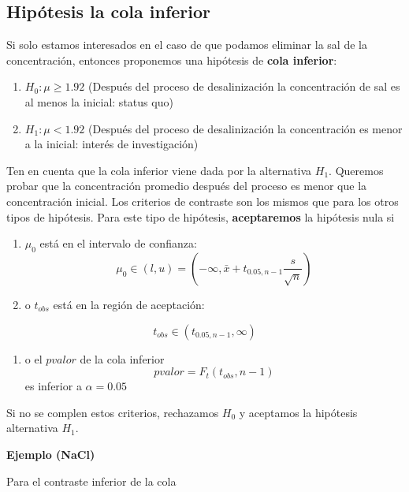 \documentclass[
]{book}
\providecommand{\tightlist}{%
  \setlength{\itemsep}{0pt}\setlength{\parskip}{0pt}}
\begin{document}
\hypertarget{hipuxf3tesis-la-cola-inferior}{%
\subsection{Hipótesis la cola inferior}\label{hipuxf3tesis-la-cola-inferior}}

Si solo estamos interesados en el caso de que podamos eliminar la sal de la concentración, entonces proponemos una hipótesis de \textbf{cola inferior}:

\begin{enumerate}
\def\labelenumi{\alph{enumi}.}
\tightlist
\item
  \(H_0:\mu \geq 1.92\) (Después del proceso de desalinización la concentración de sal es al menos la inicial: status quo)
\item
  \(H_1:\mu < 1.92\) (Después del proceso de desalinización la concentración es menor a la inicial: interés de investigación)
\end{enumerate}

Ten en cuenta que la cola inferior viene dada por la alternativa \(H_1\). Queremos probar que la concentración promedio después del proceso es menor que la concentración inicial. Los criterios de contraste son los mismos que para los otros tipos de hipótesis. Para este tipo de hipótesis, \textbf{aceptaremos} la hipótesis nula si

\begin{enumerate}
\def\labelenumi{\arabic{enumi}.}
\item
  \(\mu_0\) está en el intervalo de confianza:
  \[\mu_0\in (l,u)=(-\infty, \bar{x}+t_{0.05,n-1} \frac{s}{\sqrt{n}})\]
\item
  o \(t_{obs}\) está en la región de aceptación:
\end{enumerate}

\[t_{obs}\in (t_{0.05,n-1}, \infty)\]

\begin{enumerate}
\def\labelenumi{\arabic{enumi}.}
\setcounter{enumi}{2}
\tightlist
\item
  o el \(pvalor\) de la cola inferior
  \[pvalor=F_t(t_{obs},n-1)\]
  es inferior a \(\alpha=0.05\)
\end{enumerate}

Si no se complen estos criterios, rechazamos \(H_0\) y aceptamos la hipótesis alternativa \(H_1\).

\textbf{Ejemplo (NaCl)}

Para el contraste inferior de la cola
\end{document}
